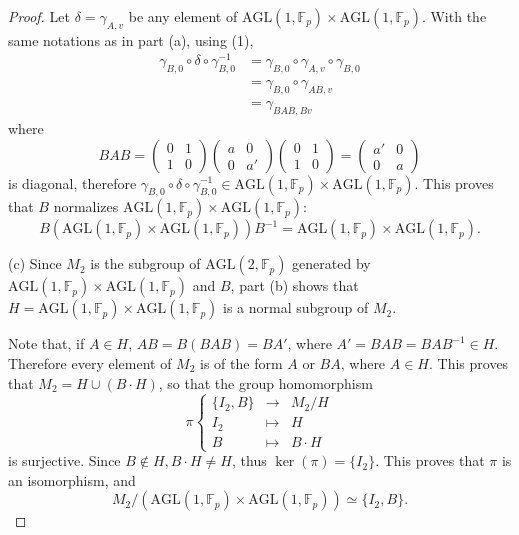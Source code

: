 \documentclass[11pt,a4paper]{article}
\newcommand{\F}{\mathbb{F}}
\begin{document}
{\begin{proof}
Let $\delta = \gamma_{A,v}$ be any element of $\mathrm{AGL}(1,\F_p) \times \mathrm{AGL}(1,\F_p)$. With the same notations as in part (a), using (1),
\begin{align*}
\gamma_{B,0} \circ \delta \circ \gamma_{B,0}^{-1} &= \gamma_{B,0} \circ \gamma_{A,v} \circ \gamma_{B,0}\\
&=\gamma_{B,0} \circ \gamma_{AB,v}\\
&=\gamma_{BAB,Bv}
\end{align*}
where 
$$
BAB = 
\begin{pmatrix}
0&1\\
1&0
\end{pmatrix}
\begin{pmatrix}
a & 0\\
0&a'
\end{pmatrix} 
\begin{pmatrix}
0&1\\
1&0
\end{pmatrix}
=
\begin{pmatrix}
a' & 0\\
0&a
\end{pmatrix} 
$$ 
is diagonal, therefore $\gamma_{B,0} \circ \delta \circ \gamma_{B,0}^{-1} \in \mathrm{AGL}(1,\F_p) \times \mathrm{AGL}(1,\F_p)$. This proves that $B$ normalizes $\mathrm{AGL}(1,\F_p) \times \mathrm{AGL}(1,\F_p)$: 
$$B \left(\mathrm{AGL}(1,\F_p) \times \mathrm{AGL}(1,\F_p)\right)B^{-1} = \mathrm{AGL}(1,\F_p) \times \mathrm{AGL}(1,\F_p).$$

\item[(c)] Since $M_2$ is the subgroup of $ \mathrm{AGL}(2,\F_p)$ generated by $\mathrm{AGL}(1,\F_p) \times \mathrm{AGL}(1,\F_p)$ and $B$, part (b) shows that $H = \mathrm{AGL}(1,\F_p) \times \mathrm{AGL}(1,\F_p)$ is a normal subgroup of $ M_2$.

Note that, if $A \in H$, $AB= B(BAB) = BA'$, where $A' = BAB = BAB^{-1} \in H$. Therefore every element of $M_2$ is of the form $A$ or $BA$, where $A\in H$. This proves that $M_2 = H \cup (B\cdot H)$, so that the group homomorphism
$$
\pi
\left\{
\begin{array}{ccc}
\{I_2,B\} & \to & M_2/H\\
I_2 & \mapsto& H\\
B & \mapsto & B\cdot  H
\end{array}
\right.
$$
is surjective. Since $B \not \in H, B \cdot H \ne H$, thus $\ker(\pi) = \{I_2\}$. This proves that $\pi$ is an isomorphism, and
$$M_2/ (\mathrm{AGL}(1,\F_p) \times \mathrm{AGL}(1,\F_p)) \simeq \{I_2,B\}.$$


\end{proof}}
\end{document}
